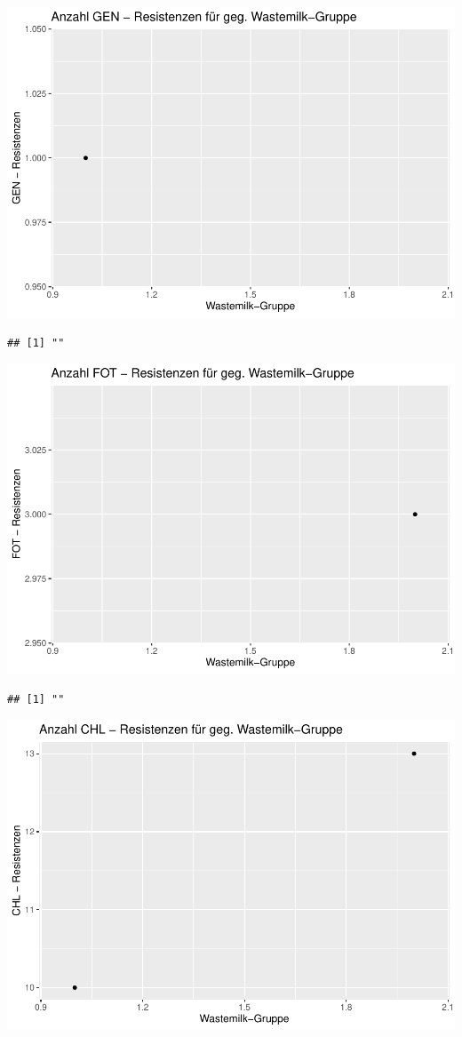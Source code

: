 \documentclass[
]{article}
\begin{document}
\includegraphics{NResistenzen_files/figure-latex/unnamed-chunk-7-4.pdf}

\begin{verbatim}
## [1] ""
\end{verbatim}

\includegraphics{NResistenzen_files/figure-latex/unnamed-chunk-7-5.pdf}

\begin{verbatim}
## [1] ""
\end{verbatim}

\includegraphics{NResistenzen_files/figure-latex/unnamed-chunk-7-6.pdf}
\end{document}
